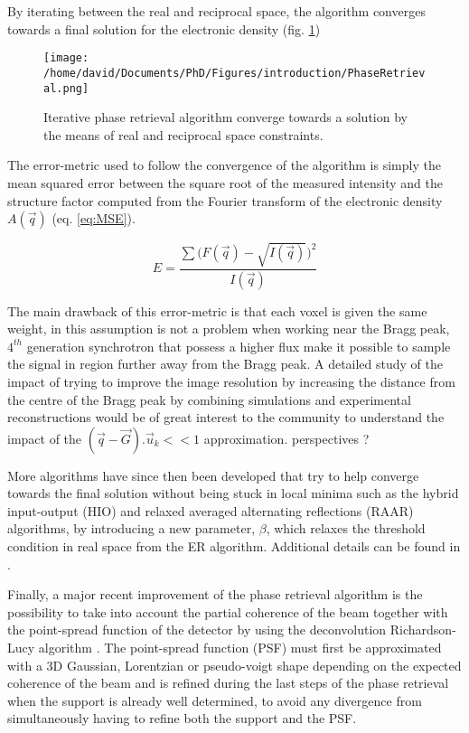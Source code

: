 By iterating between the real and reciprocal space, the algorithm converges towards a final solution for the electronic density (fig. \ref{fig:PRAlgo})

\begin{figure}[!htb]
   \centering
   \texttt{[image: /home/david/Documents/PhD/Figures/introduction/PhaseRetrieval.png]}
   \caption{
   Iterative phase retrieval algorithm converge towards a solution by the means of real and reciprocal space constraints.
   }
   \label{fig:PRAlgo}
\end{figure}

The error-metric used to follow the convergence of the algorithm is simply the mean squared error between the square root of the measured intensity and the structure factor computed from the Fourier transform of the electronic density $A(\vec{q})$ (eq. \ref{eq:MSE}).

\begin{equation}
    \label{eq:MSE}
    E = \frac{\sum \big( F(\vec{q}) - \sqrt{I(\vec{q})}  \big)^2}{I(\vec{q})}
\end{equation}

The main drawback of this error-metric is that each voxel is given the same weight, in this assumption is not a problem when working near the Bragg peak, $4^{th}$ generation synchrotron that possess a higher flux make it possible to sample the signal in region further away from the Bragg peak.
A detailed study of the impact of trying to improve the image resolution by increasing the distance from the centre of the Bragg peak by combining simulations and experimental reconstructions would be of great interest to the community to understand the impact of the $(\vec{q}-\vec{G}).\vec{u}_k<<1$ approximation.
\textcolor{Important}{perspectives ?}

More algorithms have since then been developed that try to help converge towards the final solution without being stuck in local minima such as the hybrid input-output (HIO) and relaxed averaged alternating reflections (RAAR) algorithms, by introducing a new parameter, $\beta$, which relaxes the threshold condition in real space from the ER algorithm.
Additional details can be found in \cite{Marchesini2003, Luke2005, Marchesini2007}.

Finally, a major recent improvement of the phase retrieval algorithm is the possibility to take into account the partial coherence of the beam together with the point-spread function of the detector by using the deconvolution Richardson-Lucy algorithm \parencite{Richardson1972, Lucy1974, Fish1995, Clark2012}.
The point-spread function (PSF) must first be approximated with a 3D Gaussian, Lorentzian or pseudo-voigt shape depending on the expected coherence of the beam and is refined during the last steps of the phase retrieval when the support is already well determined, to avoid any divergence from simultaneously having to refine both the support and the PSF.

